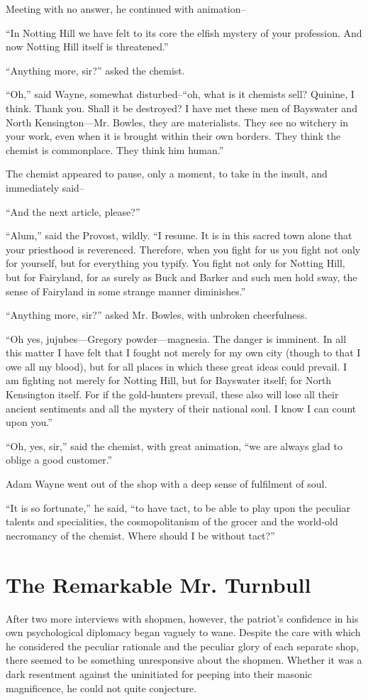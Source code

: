 \documentclass{book}
\begin{document}
Meeting with no answer, he continued with animation–

“In Notting Hill we have felt to its core the elfish mystery of your profession. And now Notting Hill itself is threatened.”

“Anything more, sir?” asked the chemist.

“Oh,” said Wayne, somewhat disturbed–“oh, what is it chemists sell? Quinine, I think. Thank you. Shall it be destroyed? I have met these men of Bayswater and North Kensington—Mr. Bowles, they are materialists. They see no witchery in your work, even when it is brought within their own borders. They think the chemist is commonplace. They think him human.”

The chemist appeared to pause, only a moment, to take in the insult, and immediately said–

“And the next article, please?”

“Alum,” said the Provost, wildly. “I resume. It is in this sacred town alone that your priesthood is reverenced. Therefore, when you fight for us you fight not only for yourself, but for everything you typify. You fight not only for Notting Hill, but for Fairyland, for as surely as Buck and Barker and such men hold sway, the sense of Fairyland in some strange manner diminishes.”

“Anything more, sir?” asked Mr. Bowles, with unbroken cheerfulness.

“Oh yes, jujubes—Gregory powder—magnesia. The danger is imminent. In all this matter I have felt that I fought not merely for my own city (though to that I owe all my blood), but for all places in which these great ideas could prevail. I am fighting not merely for Notting Hill, but for Bayswater itself; for North Kensington itself. For if the gold-hunters prevail, these also will lose all their ancient sentiments and all the mystery of their national soul. I know I can count upon you.”

“Oh, yes, sir,” said the chemist, with great animation, “we are always glad to oblige a good customer.”

Adam Wayne went out of the shop with a deep sense of fulfilment of soul.

“It is so fortunate,” he said, “to have tact, to be able to play upon the peculiar talents and specialities, the cosmopolitanism of the grocer and the world-old necromancy of the chemist. Where should I be without tact?”

\chapter{The Remarkable Mr. Turnbull}
\label{chapter-10}
After two more interviews with shopmen, however, the patriot’s confidence in his own psychological diplomacy began vaguely to wane. Despite the care with which he considered the peculiar rationale and the peculiar glory of each separate shop, there seemed to be something unresponsive about the shopmen. Whether it was a dark resentment against the uninitiated for peeping into their masonic magnificence, he could not quite conjecture.
\end{document}
